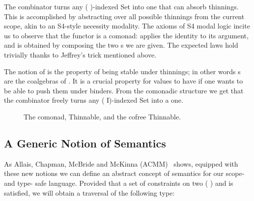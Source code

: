 The  combinator turns any ( )-indexed Set into one that can
absorb thinnings. This is accomplished by abstracting over all possible thinnings
from the current scope, akin to an S4-style necessity modality. The axioms of S4
modal logic incite us to observe that the functor  is a comonad: 
applies the identity  to its argument, and  is obtained
by composing the two s we are given. The expected laws hold trivially
thanks to Jeffrey's trick mentioned above.

The notion of  is the property of being stable under thinnings;
in other words s are the coalgebras of .
It is a crucial property for values to have if one wants to be able to push
them under binders. From the comonadic structure we get that
the  combinator freely turns any ( I)-indexed Set into a
 one.

\begin{figure}[h]
\begin{minipage}{0.45\textwidth}
\end{minipage}\hfill
\begin{minipage}{0.45\textwidth}
\end{minipage}

\begin{minipage}{0.25\textwidth}
\end{minipage}\hfill
\begin{minipage}{0.35\textwidth}
\end{minipage}\hfill
\begin{minipage}{0.30\textwidth}
\end{minipage}

\caption{The  comonad, Thinnable, and the cofree Thinnable.}
\end{figure}

\subsection{A Generic Notion of Semantics}

As Allais, Chapman, McBride and McKinna (ACMM)~\citeyear{allais2017type}
shows, equipped with these new notions we can define an abstract concept
of semantics for our scope- and type- safe language. Provided that a set of
constraints on two ({ })  and  is
satisfied, we will obtain a traversal of the following type:


